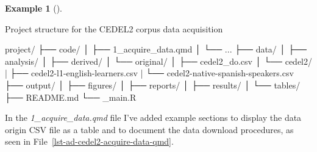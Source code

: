 \documentclass[
  letterpaper,
  DIV=11,
  numbers=noendperiod]{scrreport}
\newenvironment{Shaded}{\begin{snugshade}}{\end{snugshade}}
\newcommand{\ExtensionTok}[1]{\textcolor[rgb]{0.00,0.00,0.00}{#1}}
\newcommand{\KeywordTok}[1]{\textcolor[rgb]{0.00,0.00,0.00}{#1}}
\newcommand{\NormalTok}[1]{\textcolor[rgb]{0.00,0.00,0.00}{#1}}
\theoremstyle{definition}
\newtheorem{example}{Example}[chapter]
\theoremstyle{remark}
\begin{document}
\begin{example}[]\protect\hypertarget{exm-ad-cedel2-structure}{}\label{exm-ad-cedel2-structure}

Project structure for the CEDEL2 corpus data acquisition

\begin{Shaded}
\begin{Highlighting}[]
\ExtensionTok{project/}
\ExtensionTok{├──}\NormalTok{ code/}
\ExtensionTok{│}\NormalTok{   ├── 1\_acquire\_data.qmd}
\ExtensionTok{│}\NormalTok{   └── ...}
\ExtensionTok{├──}\NormalTok{ data/}
\ExtensionTok{│}\NormalTok{   ├── analysis/}
\ExtensionTok{│}\NormalTok{   ├── derived/}
\ExtensionTok{│}\NormalTok{   └── original/}
\ExtensionTok{│}\NormalTok{       ├── cedel2\_do.csv}
\ExtensionTok{│}\NormalTok{       └── cedel2/}
\KeywordTok{|}           \ExtensionTok{├──}\NormalTok{ cedel2{-}l1{-}english{-}learners.csv}
\KeywordTok{|}           \ExtensionTok{└──}\NormalTok{ cedel2{-}native{-}spanish{-}speakers.csv}
\ExtensionTok{├──}\NormalTok{ output/}
\ExtensionTok{│}\NormalTok{   ├── figures/}
\ExtensionTok{│}\NormalTok{   ├── reports/}
\ExtensionTok{│}\NormalTok{   ├── results/}
\ExtensionTok{│}\NormalTok{   └── tables/}
\ExtensionTok{├──}\NormalTok{ README.md}
\ExtensionTok{└──}\NormalTok{ \_main.R}
\end{Highlighting}
\end{Shaded}

\end{example}

In the \emph{1\_acquire\_data.qmd} file I've added example sections to
display the data origin CSV file as a table and to document the data
download procedures, as seen in
File~\ref{lst-ad-cedel2-acquire-data-qmd}.
\end{document}

